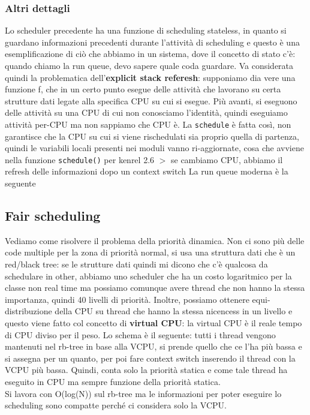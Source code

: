 \documentclass[12pt, oneside]{extbook}
\begin{document}
\subsubsection{Altri dettagli}
Lo scheduler precedente ha una funzione di scheduling stateless, in quanto si guardano informazioni precedenti durante l'attività di scheduling e questo è una esemplificazione di ciò che abbiamo in un sistema, dove il concetto di stato c'è: quando chiamo la run queue, devo sapere quale coda guardare. Va considerata quindi la problematica dell'\textbf{explicit stack referesh}: supponiamo dia vere una funzione f, che in un certo punto esegue delle attività che lavorano su certa strutture dati legate alla specifica CPU su cui si esegue. Più avanti, si eseguono delle attività su una CPU di cui non conosciamo l'identità, quindi eseguiamo attività per-CPU ma non sappiamo che CPU è. La \texttt{schedule} è fatta così, non garantisce che la CPU su cui si viene rischedulati sia proprio quella di partenza, quindi le variabili locali presenti nei moduli vanno ri-aggiornate, cosa che avviene nella funzione \texttt{schedule()} per kenrel 2.6 $>$
se cambiamo CPU, abbiamo il refresh delle informazioni dopo un context switch
La run queue moderna è la seguente
\subsection{Fair scheduling}
Vediamo come risolvere il problema della priorità dinamica. Non ci sono più delle code multiple per la zona di priorità normal, si usa una struttura dati che è un red/black tree: se le strutture dati quindi mi dicono che c'è qualcosa da schedulare in other, abbiamo uno scheduler che ha un costo logaritmico per la classe non real time ma possiamo comunque avere thread che non hanno la stessa importanza, quindi 40 livelli di priorità. Inoltre, possiamo ottenere equi-distribuzione della CPU su thread che hanno la stessa nicencess in un livello e questo viene fatto col concetto di \textbf{virtual CPU}: la virtual CPU è il reale tempo di CPU diviso per il peso. Lo schema è il seguente:
tutti i thread vengono mantenuti nel rb-tree in base alla VCPU, si prende quello che ce l'ha più bassa e si assegna per un quanto, per poi fare context switch inserendo il thread con la VCPU più bassa. Quindi, conta solo la priorità statica e come tale thread ha eseguito in CPU ma sempre funzione della priorità statica.\\Si lavora con O(log(N)) sul rb-tree ma le informazioni per poter eseguire lo scheduling sono compatte perché ci considera solo la VCPU.
\end{document}
